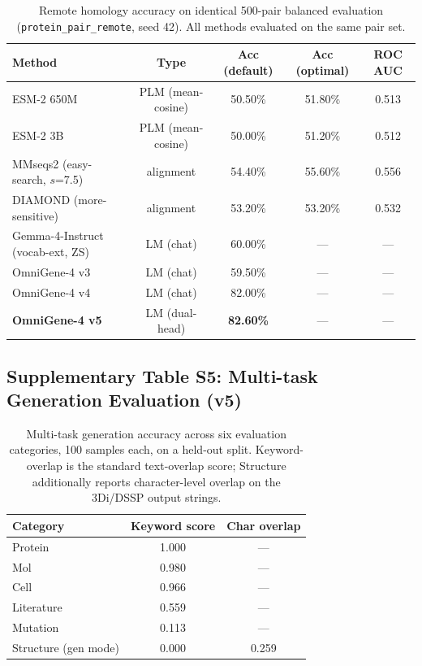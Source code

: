 \documentclass[11pt]{article}
\begin{document}
\begin{table}[H]
\centering
\small
\caption{Remote homology accuracy on identical 500-pair balanced evaluation (\texttt{protein\_pair\_remote}, seed 42). All methods evaluated on the same pair set.}
\begin{tabular}{lcccc}
\toprule
\textbf{Method} & \textbf{Type} & \textbf{Acc (default)} & \textbf{Acc (optimal)} & \textbf{ROC AUC} \\
\midrule
ESM-2 650M & PLM (mean-cosine) & 50.50\% & 51.80\% & 0.513 \\
ESM-2 3B   & PLM (mean-cosine) & 50.00\% & 51.20\% & 0.512 \\
MMseqs2 (easy-search, $s$=7.5) & alignment & 54.40\% & 55.60\% & 0.556 \\
DIAMOND (more-sensitive)     & alignment & 53.20\% & 53.20\% & 0.532 \\
Gemma-4-Instruct (vocab-ext, ZS) & LM (chat) & 60.00\% & --- & --- \\
\midrule
OmniGene-4 v3 & LM (chat) & 59.50\% & --- & --- \\
OmniGene-4 v4 & LM (chat) & 82.00\% & --- & --- \\
\textbf{OmniGene-4 v5} & LM (dual-head) & \textbf{82.60\%} & --- & --- \\
\bottomrule
\end{tabular}
\end{table}

\subsection{Supplementary Table S5: Multi-task Generation Evaluation (v5)}

\begin{table}[H]
\centering
\caption{Multi-task generation accuracy across six evaluation categories, 100 samples each, on a held-out split. Keyword-overlap is the standard text-overlap score; Structure additionally reports character-level overlap on the 3Di/DSSP output strings.}
\begin{tabular}{lcc}
\toprule
\textbf{Category} & \textbf{Keyword score} & \textbf{Char overlap} \\
\midrule
Protein     & 1.000 & --- \\
Mol         & 0.980 & --- \\
Cell        & 0.966 & --- \\
Literature  & 0.559 & --- \\
Mutation    & 0.113 & --- \\
Structure (gen mode) & 0.000 & 0.259 \\
\bottomrule
\end{tabular}
\end{table}
\end{document}
